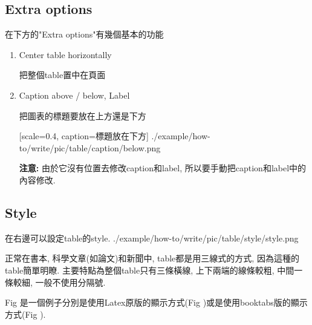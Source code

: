 \subsection{Extra options}

  在下方的"Extra options"有幾個基本的功能

\begin{enumerate}

  \item
  {
  Center table horizontally

  把整個table置中在頁面

  } %

  \label{chapter:how-to:write:table:label-example}
  \item
  {
  Caption above / below, Label

  把圖表的標題要放在上方還是下方

    {
      [scale=0.4,
      caption={標題放在下方}]
      {./example/how-to/write/pic/table/caption/below.png}
    }

  {\bf 注意:} 由於它沒有位置去修改caption和label, 所以要手動把caption和label中的內容修改.
  } %
\end{enumerate}

\newpage
\subsection{Style}

  在右邊可以設定table的style.
  \InsertCenterImage
    {./example/how-to/write/pic/table/style/style.png}

   正常在書本, 科學文章(如論文)和新聞中, table都是用三線式的方式, 因為這種的table簡單明瞭. 主要特點為整個table只有三條橫線, 上下兩端的線條較粗, 中間一條較細, 一般不使用分隔號.

  Fig 是一個例子分別是使用Latex原版的顯示方式(Fig )或是使用booktabs版的顯示方式(Fig ).

